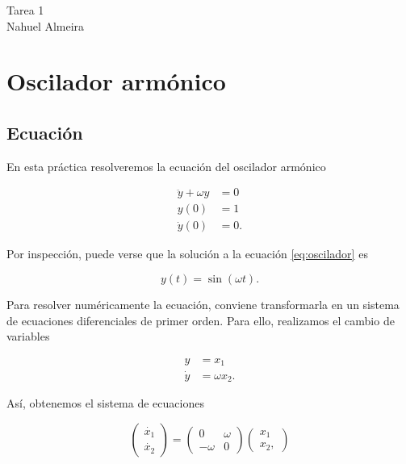 \documentclass[12pt]{article}
\begin{document}

\graphicspath{{figures/}}


\begin{center}
    \Large     Tarea 1 \\ 
    Nahuel Almeira \normalsize
\end{center}

\section{Oscilador arm\'onico}

\subsection{Ecuaci\'on}

En esta pr\'actica resolveremos la ecuaci\'on del oscilador arm\'onico 

\begin{align}\label{eq:oscilador}
\ddot{y} + \omega y &= 0 \nonumber \\
y(0) &= 1 \\
\dot{y}(0) &= 0. \nonumber
\end{align}

Por inspecci\'on, puede verse que la soluci\'on a la ecuaci\'on \ref{eq:oscilador} es 

\begin{equation}
y(t) = \sin(\omega t).
\end{equation}

Para resolver num\'ericamente la ecuaci\'on, conviene transformarla en un sistema de ecuaciones diferenciales de primer orden. Para ello, realizamos el cambio de variables 

\begin{align}
y &= x_1 \\
\dot{y} &= \omega x_2.
\end{align}

As\'i, obtenemos el sistema de ecuaciones 

\begin{equation}
\begin{pmatrix}
\dot{x_1} \\
\dot{x_2}
\end{pmatrix} = 
\begin{pmatrix}
0 & \omega \\
-\omega & 0
\end{pmatrix}
\begin{pmatrix}
x_1 \\
x_2,
\end{pmatrix}
\end{equation}
\end{document}
